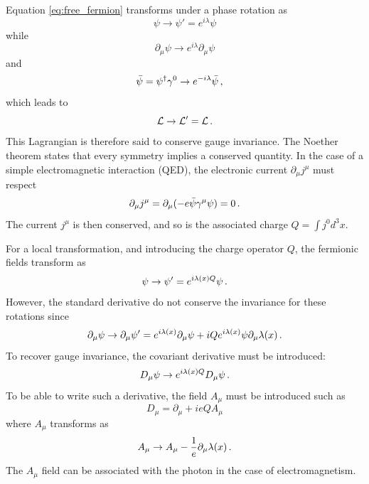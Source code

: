 Equation \ref{eq:free_fermion} transforms under a phase rotation as
\begin{equation}
    \psi \rightarrow \psi' = e^{i\lambda}\psi
\end{equation}
while
\begin{equation}
    \partial_{\mu}\psi \rightarrow e^{i\lambda}\partial_{\mu}\psi
\end{equation}
and
\begin{equation}
    \Bar{\psi} = \psi^{\dagger}\gamma^{0} \rightarrow e^{-i\lambda}\Bar{\psi} \msep
\end{equation}
which leads to 
\begin{equation}
    \Lagr \rightarrow \Lagr' = \Lagr \mend
\end{equation}
This Lagrangian is therefore said to conserve gauge invariance. The Noether theorem states that every symmetry implies a conserved quantity. In the case of a simple electromagnetic interaction (QED), the electronic current $\partial_{\mu}j^{\mu}$ must respect
\begin{equation}
    \partial_{\mu}j^{\mu} = \partial_{\mu}(-e\Bar{\psi}\gamma^{\mu}\psi) = 0 \mend
\end{equation}
The current $j^{\mu}$ is then conserved, and so is the associated charge $Q = \int j^{0}d^3 x$. \newline

For a local transformation, and introducing the charge operator $Q$, the fermionic fields transform as
\begin{equation}
    \psi \rightarrow \psi' = e^{i\lambda(x)Q}\psi \mend
\end{equation}
However, the standard derivative do not conserve the invariance for these rotations since
\begin{equation}
    \partial_{\mu}\psi \rightarrow \partial_{\mu}\psi' = e^{i\lambda(x)}\partial_{\mu}\psi + iQe^{i\lambda(x)}\psi\partial_{\mu}\lambda(x) \mend
\end{equation}
To recover gauge invariance, the covariant derivative must be introduced:
\begin{equation}
    D_{\mu}\psi \rightarrow e^{i\lambda(x)Q}D_{\mu}\psi \mend
\end{equation}
To be able to write such a derivative, the field $A_{\mu}$ must be introduced such as
\begin{equation}
    D_{\mu} = \partial_{\mu} + ieQA_{\mu}
\end{equation}
where $A_{\mu}$ transforms as
\begin{equation}
    A_{\mu} \rightarrow A_{\mu} - \frac{1}{e}\partial_{\mu}\lambda(x) \mend
\end{equation}
The $A_{\mu}$ field can be associated with the photon in the case of electromagnetism. \newline

